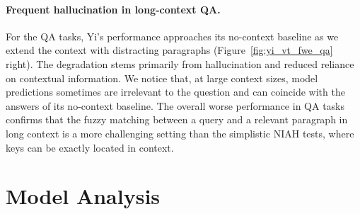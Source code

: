 \paragraph{Frequent hallucination in long-context QA.} For the QA tasks, Yi's performance approaches its no-context baseline as we extend the context with distracting paragraphs (Figure~\ref{fig:yi_vt_fwe_qa} right). The degradation stems primarily from hallucination and reduced reliance on contextual information. We notice that, at large context sizes, model predictions sometimes are irrelevant to the question and can coincide with the answers of its no-context baseline. The overall worse performance in QA tasks confirms that the fuzzy matching between a query and a relevant paragraph in long context is a more challenging setting than the simplistic NIAH tests, where keys can be exactly located in context.





\section{Model Analysis} \label{sec:mdl_analysis}


